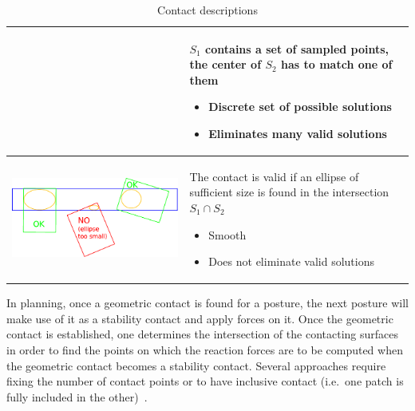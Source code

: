 \begin{table}[ht!]
\begin{tabular}{c m{8cm}}
\begin{minipage}{.4\textwidth}
    \end{minipage}
    &
    $S_1$ contains a set of sampled points, the center of $S_2$ has to match one of them~\cite{chestnutt:humanoids:2003}
    \begin{itemize}
      \item Discrete set of possible solutions
      \item Eliminates many valid solutions
    \end{itemize}
    \\ \midrule
    \begin{minipage}{.4\textwidth}
      \includegraphics[width=0.9\linewidth]{contact4.pdf}
    \end{minipage}
    &
    The contact is valid if an ellipse of sufficient size is found in
    the intersection $S_1 \cap S_2$~\cite{brossette:iros:2014}
    \begin{itemize}
      \item Smooth
      \item Does not eliminate valid solutions
    \end{itemize}
    \\ \bottomrule
  \end{tabular}
  \caption{Contact descriptions}
\label{tbl:contact_description}
\end{table}

In planning, once a geometric contact is found for a posture, the next posture will make use of it as a stability contact and apply forces on it.
Once the geometric contact is established, one determines the intersection of the contacting surfaces in order to find the points on which the reaction forces are to be computed when the geometric contact becomes a stability contact.
Several approaches require fixing the number of contact points or to have inclusive contact (i.e.\ one patch is fully included in the other)~\cite{bouyarmane:ar:2012}.


